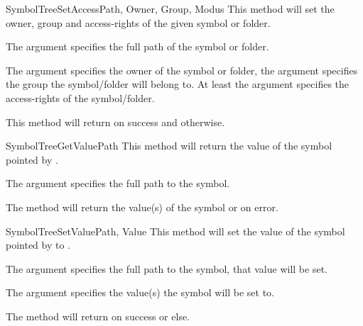 \begin{methoddesc}[Core]{SymbolTreeSetAccess}{Path, Owner, Group, Modus}
This method will set the owner, group and access-rights of the given symbol or folder.

The argument  specifies the full path of the symbol or folder.

The argument  specifies the owner of the symbol or folder, the 
argument  specifies the group the symbol/folder will belong to.
At least the argument  specifies the access-rights of the
symbol/folder.

This method will return  on success and  otherwise.
\end{methoddesc}


\begin{methoddesc}[Core]{SymbolTreeGetValue}{Path}
This method will return the value of the symbol pointed by .

The argument  specifies the full path to the symbol. 

The method will return the value(s) of the symbol or  on error.
\end{methoddesc}


\begin{methoddesc}[Core]{SymbolTreeSetValue}{Path, Value}
This method will set the value of the symbol pointed by  to .

The argument  specifies the full path to the symbol, that value will be set.

The argument  specifies the value(s) the symbol will be set to.

The method will return  on success or  else.
\end{methoddesc}


